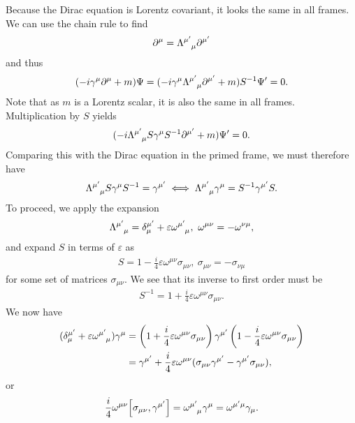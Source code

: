 Because the Dirac equation is Lorentz covariant, it looks the same in all frames. We can use the chain rule to find
\begin{align*}
	\del{\mu}{} = \tensor{\Lambda}{^{\mu\p}_{\mu}}\del{\mu\p}{}
\end{align*}
and thus
\begin{align*}
	(-i\gamma^{\mu}\del{\mu}{} + m)\Psi = (-i\gamma^{\mu}\tensor{\Lambda}{^{\mu\p}_{\mu}}\del{\mu\p}{} + m)S^{-1}\Psi\p = 0.
\end{align*}
Note that as $m$ is a Lorentz scalar, it is also the same in all frames. Multiplication by $S$ yields
\begin{align*}
	(-i\tensor{\Lambda}{^{\mu\p}_{\mu}}S\gamma^{\mu}S^{-1}\del{\mu\p}{} + m)\Psi\p = 0.
\end{align*}
Comparing this with the Dirac equation in the primed frame, we must therefore have
\begin{align*}
	\tensor{\Lambda}{^{\mu\p}_{\mu}}S\gamma^{\mu}S^{-1} = \gamma^{\mu\p} \iff \tensor{\Lambda}{^{\mu\p}_{\mu}}\gamma^{\mu} = S^{-1}\gamma^{\mu\p}S.
\end{align*}
To proceed, we apply the expansion
\begin{align*}
	\tensor{\Lambda}{^{\mu\p}_{\mu}} = \kdelta{\mu\p}{\mu} + \varepsilon\tensor{\omega}{^{\mu\p}_{\mu}},\ \omega^{\mu\nu} = -\omega^{\nu\mu},
\end{align*}
and expand $S$ in terms of $\varepsilon$ as
\begin{align*}
	S = 1 - \frac{i}{4}\varepsilon\omega^{\mu\nu}\sigma_{\mu\nu},\ \sigma_{\mu\nu} = -\sigma_{\nu\mu}
\end{align*}
for some set of matrices $\sigma_{\mu\nu}$. We see that its inverse to first order must be
\begin{align*}
	S^{-1} = 1 + \frac{i}{4}\varepsilon\omega^{\mu\nu}\sigma_{\mu\nu}.
\end{align*}
We now have
\begin{align*}
	(\kdelta{\mu\p}{\mu} + \varepsilon\tensor{\omega}{^{\mu\p}_{\mu}})\gamma^{\mu} &= \left(1 + \frac{i}{4}\varepsilon\omega^{\mu\nu}\sigma_{\mu\nu}\right)\gamma^{\mu\p}\left(1 - \frac{i}{4}\varepsilon\omega^{\mu\nu}\sigma_{\mu\nu}\right) \\
	&= \gamma^{\mu\p} + \frac{i}{4}\varepsilon\omega^{\mu\nu}(\sigma_{\mu\nu}\gamma^{\mu\p} - \gamma^{\mu\p}\sigma_{\mu\nu}),
\end{align*}
or
\begin{align*}
	\frac{i}{4}\omega^{\mu\nu}\comm{\sigma_{\mu\nu}}{\gamma^{\mu\p}} = \tensor{\omega}{^{\mu\p}_{\mu}}\gamma^{\mu} = \tensor{\omega}{^{\mu\p\mu}}\gamma_{\mu}.
\end{align*}
